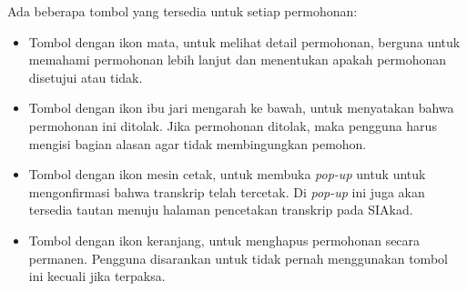 Ada beberapa tombol yang tersedia untuk setiap permohonan:
\begin{itemize}
	\item Tombol dengan ikon mata, untuk melihat detail permohonan, berguna untuk memahami permohonan lebih lanjut dan menentukan apakah permohonan disetujui atau tidak.
	\item Tombol dengan ikon ibu jari mengarah ke bawah, untuk menyatakan bahwa permohonan ini ditolak. Jika permohonan ditolak, maka pengguna harus mengisi bagian alasan agar tidak membingungkan pemohon.
	\item Tombol dengan ikon mesin cetak, untuk membuka \textit{pop-up} untuk untuk mengonfirmasi bahwa transkrip telah tercetak. Di \textit{pop-up} ini juga akan tersedia tautan menuju halaman pencetakan transkrip pada SIAkad.
	\item Tombol dengan ikon keranjang, untuk menghapus permohonan secara permanen. Pengguna disarankan untuk tidak pernah menggunakan tombol ini kecuali jika terpaksa.
\end{itemize} 